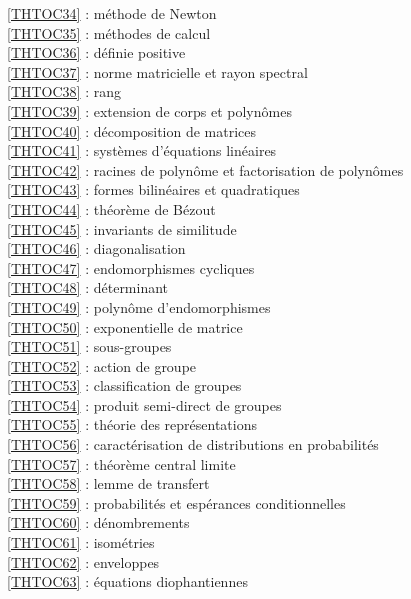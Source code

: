 \ref {THTOC34} : méthode de Newton\\
\ref {THTOC35} : méthodes de calcul\\
\ref {THTOC36} : définie positive\\
\ref {THTOC37} : norme matricielle et rayon spectral\\
\ref {THTOC38} : rang\\
\ref {THTOC39} : extension de corps et polynômes\\
\ref {THTOC40} : décomposition de matrices\\
\ref {THTOC41} : systèmes d'équations linéaires\\
\ref {THTOC42} : racines de polynôme et factorisation de polynômes\\
\ref {THTOC43} : formes bilinéaires et quadratiques\\
\ref {THTOC44} : théorème de Bézout\\
\ref {THTOC45} : invariants de similitude\\
\ref {THTOC46} : diagonalisation\\
\ref {THTOC47} : endomorphismes cycliques\\
\ref {THTOC48} : déterminant\\
\ref {THTOC49} : polynôme d'endomorphismes\\
\ref {THTOC50} : exponentielle de matrice\\
\ref {THTOC51} : sous-groupes\\
\ref {THTOC52} : action de groupe\\
\ref {THTOC53} : classification de groupes\\
\ref {THTOC54} : produit semi-direct de groupes\\
\ref {THTOC55} : théorie des représentations\\
\ref {THTOC56} : caractérisation de distributions en probabilités\\
\ref {THTOC57} : théorème central limite\\
\ref {THTOC58} : lemme de transfert\\
\ref {THTOC59} : probabilités et espérances conditionnelles\\
\ref {THTOC60} : dénombrements\\
\ref {THTOC61} : isométries\\
\ref {THTOC62} : enveloppes\\
\ref {THTOC63} : équations diophantiennes\\
